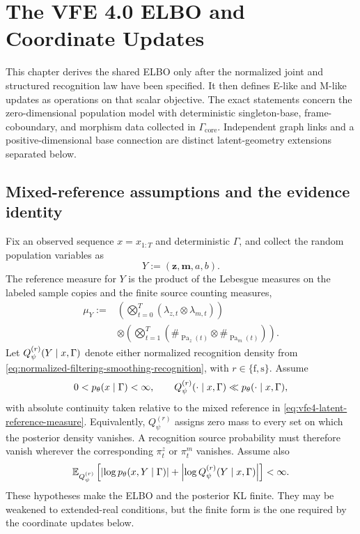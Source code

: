 \chapter[The VFE 4.0 ELBO and Coordinate Updates]{The VFE 4.0 ELBO and\\Coordinate Updates}

This chapter derives the shared ELBO only after the normalized joint and structured recognition law have been specified. It then defines E-like and M-like updates as operations on that scalar objective. The exact statements concern the zero-dimensional population model with deterministic singleton-base, frame-coboundary, and morphism data collected in $\Gamma_{\mathrm{core}}$. Independent graph links and a positive-dimensional base connection are distinct latent-geometry extensions separated below.

\section{Mixed-reference assumptions and the evidence identity}

Fix an observed sequence $x=x_{1:T}$ and deterministic $\Gamma$, and collect the random population variables as
\begin{equation}
Y:=(\boldsymbol z,\boldsymbol m,a,b).
\label{eq:vfe4-latent-inventory}
\end{equation}
The reference measure for $Y$ is the product of the Lebesgue measures on the labeled sample copies and the finite source counting measures,
\begin{equation}
\begin{aligned}
\mu_Y
:={}&\left(\bigotimes_{t=0}^{T}
(\lambda_{z,t}\otimes\lambda_{m,t})\right)\\
&\otimes\left(\bigotimes_{t=1}^{T}
(\#_{\operatorname{Pa}_z(t)}\otimes
\#_{\operatorname{Pa}_m(t)})\right).
\end{aligned}
\label{eq:vfe4-latent-reference-measure}
\end{equation}
Let $Q_\psi^{(r)}(Y\mid x,\Gamma)$ denote either normalized recognition density from \cref{eq:normalized-filtering-smoothing-recognition}, with $r\in\{\mathrm f,\mathrm s\}$. Assume
\begin{equation}
0<p_\theta(x\mid\Gamma)<\infty,
\qquad
Q_\psi^{(r)}(\mathord{\cdot}\mid x,\Gamma)
\ll p_\theta(\mathord{\cdot}\mid x,\Gamma),
\label{eq:elbo-posterior-absolute-continuity}
\end{equation}
with absolute continuity taken relative to the mixed reference in \cref{eq:vfe4-latent-reference-measure}. Equivalently, $Q_\psi^{(r)}$ assigns zero mass to every set on which the posterior density vanishes. A recognition source probability must therefore vanish wherever the corresponding $\pi_t^z$ or $\pi_t^m$ vanishes. Assume also
\begin{equation}
\mathbb E_{Q_\psi^{(r)}}\left[
\left|\log p_\theta(x,Y\mid\Gamma)\right|
+\left|\log Q_\psi^{(r)}(Y\mid x,\Gamma)\right|
\right]<\infty.
\label{eq:elbo-log-integrability}
\end{equation}
These hypotheses make the ELBO and the posterior KL finite. They may be weakened to extended-real conditions, but the finite form is the one required by the coordinate updates below.

